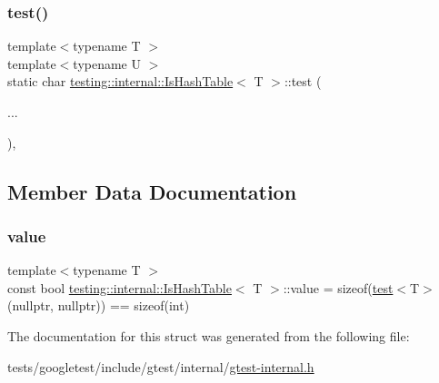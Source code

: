 \subsubsection{\texorpdfstring{test()}{test()}\hspace{0.1cm}{\footnotesize\ttfamily [3/3]}}
{\footnotesize\ttfamily template$<$typename T $>$ \\
template$<$typename U $>$ \\
static char \hyperlink{structtesting_1_1internal_1_1IsHashTable}{testing\+::internal\+::\+Is\+Hash\+Table}$<$ T $>$\+::test (\begin{DoxyParamCaption}\item[{}]{... }\end{DoxyParamCaption})\hspace{0.3cm}{\ttfamily [static]}, {\ttfamily [private]}}



\subsection{Member Data Documentation}
\mbox{\label{structtesting_1_1internal_1_1IsHashTable_a165e0a3eddfa5fadf9b950be6432d848}} 
\subsubsection{\texorpdfstring{value}{value}}
{\footnotesize\ttfamily template$<$typename T $>$ \\
const bool \hyperlink{structtesting_1_1internal_1_1IsHashTable}{testing\+::internal\+::\+Is\+Hash\+Table}$<$ T $>$\+::value = sizeof(\hyperlink{structtesting_1_1internal_1_1IsHashTable_acc4d1e2307a1e0527932da7a7d354f06}{test}$<$T$>$(nullptr, nullptr)) == sizeof(int)\hspace{0.3cm}{\ttfamily [static]}}



The documentation for this struct was generated from the following file\+:\begin{DoxyCompactItemize}
\item 
tests/googletest/include/gtest/internal/\hyperlink{gtest-internal_8h}{gtest-\/internal.\+h}\end{DoxyCompactItemize}
